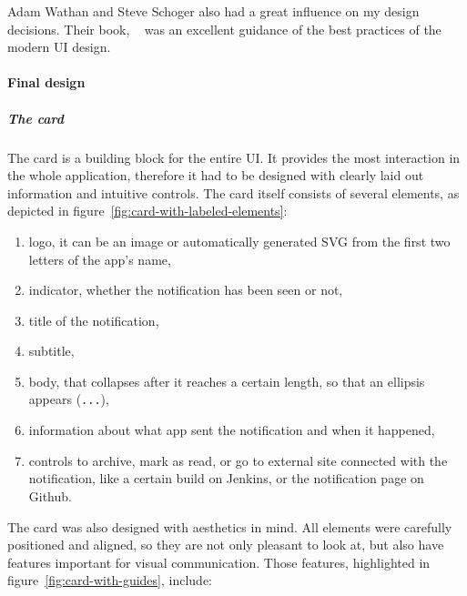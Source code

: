 Adam Wathan and Steve Schoger
also had a great influence
on my design decisions.
Their book,
~\cite{wathan_refactoring_2018}
was an excellent guidance of the best practices
of the modern \ac{UI} design.

\paragraph{Final design}\label{sec:final-design}

\subparagraph*{The card}\label{par:the-card}

The card is a building block for the entire \ac{UI}.
It provides the most interaction in the whole application,
therefore it had to be designed with clearly laid out information
and intuitive controls.
The card itself consists of several elements,
as depicted in figure~\ref{fig:card-with-labeled-elements}:

\begin{enumerate}
  \item
        logo,
        it can be an image
        or automatically generated \ac{SVG}
        from the first two letters of the app's name,
  \item
        indicator,
        whether the notification has been seen or not,
  \item
        title of the notification,
  \item
        subtitle,
  \item
        body,
        that collapses after it reaches a certain length,
        so that an ellipsis appears (\texttt{...}),
  \item
        information about what app sent the notification and when it happened,
  \item
        controls to archive,
        mark as read,
        or go to external site connected with the notification,
        like a certain build on Jenkins,
        or the notification page on Github.
\end{enumerate}

The card was also designed with aesthetics in mind.
All elements were carefully positioned and aligned,
so they are not only pleasant to look at,
but also have features important for visual communication.
Those features, highlighted in figure~\ref{fig:card-with-guides}, include:

